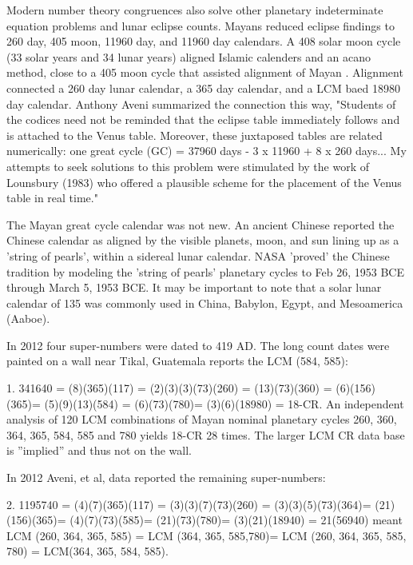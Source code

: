 \documentclass[12pt]{article}
\begin{document}
{Modern number theory congruences also solve other planetary indeterminate equation problems and lunar eclipse counts. Mayans reduced eclipse findings to 260 day, 405 moon, 11960 day, and 11960 day calendars. A 408 solar moon cycle (33 solar years and 34 lunar years) aligned Islamic calenders and an acano method, close to a 405 moon cycle that assisted alignment of Mayan . Alignment connected a 260 day lunar calendar, a 365 day calendar, and a LCM baed 18980 day calendar. Anthony Aveni summarized the connection this way, "Students of the codices need not be reminded that the eclipse table immediately follows and is attached to the Venus table. Moreover, these juxtaposed tables are related numerically: one great cycle (GC) = 37960 days - 3 x 11960 + 8 x 260 days... My attempts to seek solutions to this problem were stimulated by the work of Lounsbury (1983) who offered a plausible scheme for the placement of the Venus table in real time."

The Mayan great cycle calendar was not new. An ancient Chinese  reported the Chinese calendar as aligned by the visible planets, moon, and sun lining up as a 'string of pearls', within a sidereal lunar calendar. NASA 'proved' the Chinese tradition by modeling the 'string of pearls' planetary cycles to Feb 26, 1953 BCE through March 5, 1953 BCE. It may be important to note that a solar lunar calendar of 135 was commonly used in China, Babylon, Egypt, and Mesoamerica (Aaboe). 

In 2012 four super-numbers were dated to 419 AD. The long count dates were painted on a wall near Tikal, Guatemala reports the LCM (584, 585):

1. 341640 = (8)(365)(117) = (2)(3)(3)(73)(260) = (13)(73)(360) = (6)(156)(365)= (5)(9)(13)(584) = (6)(73)(780)= (3)(6)(18980) = 18-CR. An independent analysis of 120 LCM combinations of Mayan nominal planetary cycles 260, 360, 364, 365, 584, 585 and 780 yields 18-CR 28 times. The larger LCM CR data base is ”implied” and thus not on the wall.

In 2012 Aveni, et al, data reported the remaining super-numbers:

2. 1195740 = (4)(7)(365)(117) = (3)(3)(7)(73)(260) = (3)(3)(5)(73)(364)= (21)(156)(365)= (4)(7)(73)(585)= (21)(73)(780)= (3)(21)(18940) = 21(56940) meant LCM (260, 364, 365, 585) = LCM (364, 365, 585,780)= LCM (260, 364, 365, 585, 780) = LCM(364, 365, 584, 585).

}
\end{document}
